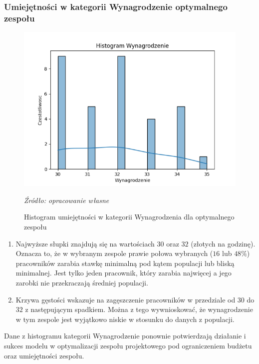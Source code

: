         \subsubsection{Umiejętności w kategorii Wynagrodzenie optymalnego zespołu}
        \begin{figure}[H]
            \centering
            \includegraphics[width=\linewidth]{chapters/Images/hist_wynagrodzenie_optimal.png}
            \cprotect\caption{Histogram umiejętności w kategorii Wynagrodzenia dla optymalnego zespołu}
            \textit{Źródło: opracowanie własne} 
            \label{fig:hist_wynagrodzenie_optimal}
        \end{figure}

        \begin{enumerate}
            \item Najwyższe słupki znajdują się na wartościach $30$ oraz $32$ (złotych na godzinę). Oznacza to, że w wybranym zespole prawie połowa wybranych ($16$ lub $48\%$) pracowników zarabia stawkę minimalną pod kątem populacji lub bliską minimalnej. Jest tylko jeden pracownik, który zarabia najwięcej a jego zarobki nie przekraczają średniej populacji.
            \item Krzywa gęstości wskazuje na zagęszczenie pracowników w przedziale od $30$ do $32$ z następującym spadkiem. Można z tego wywnioskować, że wynagrodzenie w tym zespole jest wyjątkowo niskie w stosunku do danych z populacji.
        \end{enumerate}
        
        \par Dane z histogramu kategorii Wynagrodzenie ponownie potwierdzają działanie i sukces modelu w optymalizacji zespołu projektowego pod ograniczeniem budżetu oraz umiejętności zespołu.
    
